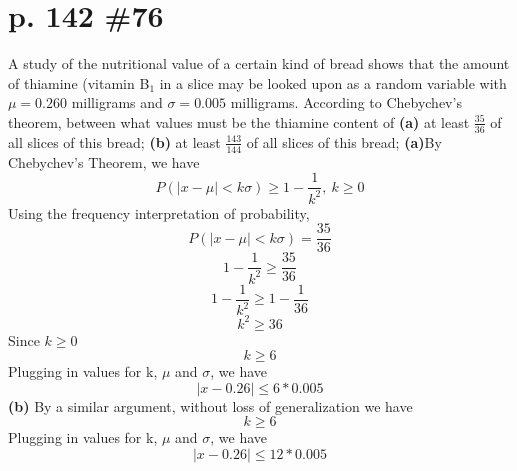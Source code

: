 \documentclass[12pt]{article}
\begin{document}
\section[20pt]{p. 142 \#76}
A study of the nutritional value of a certain kind of bread shows that the amount of thiamine (vitamin B\(_1\) in a slice may be looked upon as a random variable with \(\mu = 0.260\) milligrams and \(\sigma = 0.005\) milligrams. According to Chebychev's theorem, between what values must be the thiamine content of \newline
\textbf{(a)} at least \(\frac{35}{36}\) of all slices of this bread; \newline
\textbf{(b)} at least \(\frac{143}{144}\) of all slices of this bread; \newline
\newline
\textbf{(a)}By Chebychev's Theorem, we have
\[P(|x-\mu|<k\sigma) \geq 1 - \frac{1}{k^2}, \ k\geq0\]
Using the frequency interpretation of probability, \[P(|x-\mu|<k\sigma) = \frac{35}{36}\]
\[1 - \frac{1}{k^2} \geq \frac{35}{36}\]
\[1 - \frac{1}{k^2} \geq 1- \frac{1}{36}\]
\[k^2 \geq 36\]
Since \(k\geq0\)
\[k \geq 6\]
Plugging in values for k, \(\mu\) and \(\sigma\), we have
\[|x-0.26|\leq6*0.005\]
\newline
\newline
\newline
\textbf{(b)} By a similar argument, without loss of generalization we have
\[k \geq 6\]
Plugging in values for k, \(\mu\) and \(\sigma\), we have
\[|x-0.26|\leq12*0.005\]
\end{document}
